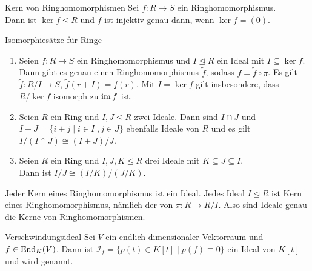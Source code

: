 \begin{Lemma}{Kern von Ringhomomorphismen}
    Sei $f: R \rightarrow S$ ein Ringhomomorphismus. \\
    Dann ist $\ker f \trianglelefteq R$ und $f$ ist injektiv genau dann,
    wenn $\ker f = (0)$.
\end{Lemma}

\begin{Satz}{Isomorphiesätze für Ringe}
    \begin{enumerate}
        \item
        Seien $f: R \rightarrow S$ ein Ringhomomorphismus
        und $I \trianglelefteq R$ ein Ideal mit $I \subseteq \ker f$.
        Dann gibt es genau einen Ringhomomorphismus $\widetilde{f}$, sodass
        $f = \widetilde{f} \circ \pi$.
        Es gilt $\widetilde{f}: R/I \rightarrow S$,
        $\widetilde{f}(r + I) = f(r)$.
        Mit $I = \ker f$ gilt insbesondere, dass $R/\ker f$ isomorph
        zu $\operatorname{im} f$ ist.
        
        \item
        Seien $R$ ein Ring und $I, J \trianglelefteq R$ zwei Ideale.
        Dann sind $I \cap J$ und \\
        $I + J = \{i + j \;|\; i \in I\;, j \in J\}$
        ebenfalls Ideale von $R$ und es gilt
        $I/(I \cap J) \cong (I + J)/J$.
        
        \item
        Seien $R$ ein Ring und $I, J, K \trianglelefteq R$ drei Ideale
        mit $K \subseteq J \subseteq I$. \\
        Dann ist $I/J \cong (I/K)/(J/K)$.
    \end{enumerate}
\end{Satz}

\begin{Bem}
    Jeder Kern eines Ringhomomorphismus ist ein Ideal.
    Jedes Ideal $I \trianglelefteq R$ ist Kern eines Ringhomomorphismus,
    nämlich der von $\pi: R \rightarrow R/I$.
    Also sind Ideale genau die Kerne von Ringhomomorphismen.
\end{Bem}

\pagebreak

\begin{Def}{Verschwindungsideal}
    Sei $V$ ein endlich-dimensionaler Vektorraum und $f \in \operatorname{End}_K(V)$.
    Dann ist
    $\mathcal{I}_f = \{p(t) \in K[t] \;|\; p(f) \equiv 0\}$
    ein Ideal von $K[t]$ und wird  genannt.
\end{Def}

